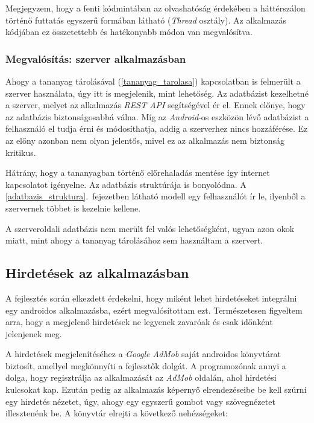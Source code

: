 \documentclass[12pt,a4paper]{article}
\begin{document}
	Megjegyzem, hogy a fenti kódmintában az olvashatóság érdekében a háttérszálon történő futtatás egyszerű formában látható (\textit{Thread} osztály). Az alkalmazás kódjában ez összetettebb és hatékonyabb módon van megvalósítva. 
	
	\subsubsection{Megvalósítás: szerver alkalmazásban}
	
	Ahogy a tananyag tárolásával (\ref{tananyag_tarolasa}) kapcsolatban is felmerült a szerver használata, úgy itt is megjelenik, mint lehetőség. Az adatbázist kezelhetné a szerver, melyet az alkalmazás \textit{REST API} segítségével ér el. Ennek előnye, hogy az adatbázis biztonságosabbá válna. Míg az \textit{Android}-os eszközön lévő adatbázist a felhasználó el tudja érni és módosíthatja, addig a szerverhez nincs hozzáférése. Ez az előny azonban nem olyan jelentős, mivel ez az alkalmazás nem biztonság kritikus. 
	
	Hátrány, hogy a tananyagban történő előrehaladás mentése így internet kapcsolatot igényelne. Az adatbázis struktúrája is bonyolódna. A \ref{adatbazis_struktura}.\ fejezetben látható modell egy felhasználót ír le, ilyenből a szervernek többet is kezelnie kellene.
	
	A szerveroldali adatbázis nem merült fel valós lehetőségként, ugyan azon okok miatt, mint ahogy a tananyag tárolásához sem használtam a szervert.

	\subsection{Hirdetések az alkalmazásban}
	
	A fejlesztés során elkezdett érdekelni, hogy miként lehet hirdetéseket integrálni egy androidos alkalmazásba, ezért megvalósítottam ezt. Természetesen figyeltem arra, hogy a megjelenő hirdetések ne legyenek zavaróak és csak időnként jelenjenek meg.
	
	A hirdetések megjelenítéséhez a \textit{Google AdMob} saját androidos könyvtárat biztosít, amellyel megkönnyíti a fejlesztők dolgát. A programozónak annyi a dolga, hogy regisztrálja az alkalmazását az \textit{AdMob} oldalán, ahol hirdetési kulcsokat kap. Ezután pedig az alkalmazás képernyő elrendezéseibe be kell szúrni egy hirdetés nézetet, úgy, ahogy egy egyszerű gombot vagy szövegnézetet illesztenénk be. A könyvtár elrejti a következő nehézségeket:
	
\end{document}
